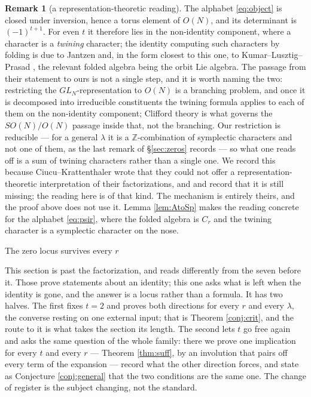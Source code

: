 \documentclass[11pt,reqno]{amsart}
\makeatletter
\renewcommand\section{\@startsection{section}{1}%
  \z@{\linespacing\@plus\linespacing}{.5\linespacing}%
  {\normalfont\large\bfseries\centering}}
\theoremstyle{plain}
\theoremstyle{definition}
\newtheorem{remark}[theorem]{Remark}
\newcommand{\ZZ}{\mathbb{Z}}
\makeatother
\begin{document}
\begin{remark}[a representation-theoretic reading]\label{rem:twining}
The alphabet \eqref{eq:object} is closed under inversion, hence a torus element of $O(N)$, and its
determinant is $(-1)^{t+1}$. For even $t$ it therefore lies in the non-identity component, where a
character is a \emph{twining} character; the identity computing such characters by folding is due to
Jantzen \cite{Jantzen} and, in the form closest to this one, to Kumar--Lusztig--Prasad \cite{KLP},
the relevant folded algebra being the orbit Lie algebra. The passage from their statement to ours
is not a single step, and it is worth naming the two: restricting the $GL_N$-representation to
$O(N)$ is a branching problem, and once it is decomposed into irreducible constituents the twining
formula applies to each of them on the non-identity component; Clifford theory is what governs the
$SO(N)/O(N)$ passage inside that, not the branching. Our restriction is reducible --- for a general
$\lambda$ it is a $\ZZ$-combination of symplectic characters and not one of them, as the last remark
of \S\ref{sec:zeros} records --- so what one reads off is a sum of twining characters rather than a
single one. We record this because Ciucu--Krattenthaler
\cite{CK09} wrote that they could not offer a representation-theoretic interpretation of their
factorizations, and \cite{AB19} and \cite{AK25} record that it is still missing; the reading here is
of that kind. The mechanism is entirely theirs, and the proof above does not use it. Lemma
\ref{lem:AtoSp} makes the reading concrete for the alphabet \eqref{eq:psir}, where the folded algebra
is $C_r$ and the twining character is a symplectic character on the nose.
\end{remark}

\section{The zero locus survives every $r$}\label{sec:zeros}

This section is past the factorization, and reads differently from the seven before it. Those prove
statements about an identity; this one asks what is left when the identity is gone, and the answer is
a locus rather than a formula. It has two halves. The first fixes $t=2$ and proves both directions
for every $r$ and every $\lambda$, the converse resting on one external input; that is Theorem
\ref{conj:crit}, and the route to it is what takes the section its length. The second lets $t$ go
free again and asks the same question of the whole family: there we prove one implication for every
$t$ and every $r$ --- Theorem \ref{thm:suff}, by an involution that pairs off every term of the
expansion --- record what the other direction forces, and state as Conjecture \ref{conj:general} that
the two conditions are the same one. The change of register is the subject changing, not the
standard.
\end{document}
